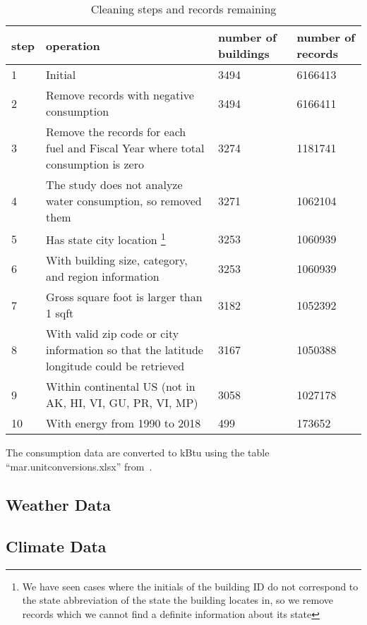 \documentclass[12pt]{article}
\begin{document}
\begin{table}[H]
  \caption{Cleaning steps and records remaining}
  \centering
  \fontsize{10}{12}\selectfont
  \begin{tabular}{l|p{6cm}|l|l}
  \toprule
    step & operation &number of buildings& number of records\\
  \midrule
    1& Initial& 3494 &6166413\\
    2& Remove records with negative consumption & 3494 & 6166411\\
    3& Remove the records for each fuel and Fiscal Year where total consumption is zero & 3274 & 1181741\\
    4& The study does not analyze water consumption, so removed them & 3271 & 1062104\\
    5& Has state city location \footnote{We have seen cases where the initials of the building ID do not correspond to the state abbreviation of the state the building locates in, so we remove records which we cannot find a definite information about its state} & 3253 & 1060939\\
    6& With building size, category, and region information & 3253 & 1060939\\
    7& Gross square foot is larger than 1 sqft & 3182 & 1052392\\
    8& With valid zip code or city information so that the latitude longitude could be retrieved & 3167 & 1050388\\
    9& Within continental US (not in AK, HI, VI, GU, PR, VI, MP) & 3058 & 1027178\\
    10& With energy from 1990 to 2018 & 499 & 173652\\
  \bottomrule
  \end{tabular}
  \label{tab:cleaning_steps}
\end{table}

The consumption data are converted to kBtu using the table
``mar.unitconversions.xlsx'' from~\cite{euas2019}.

\subsection{Weather Data}

\subsection{Climate Data}
\end{document}
